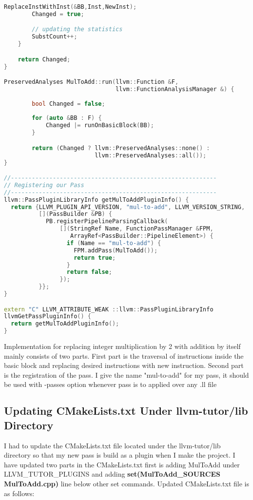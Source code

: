 \documentclass[16pt]{article}
\begin{document}
\begin{lstlisting}[caption=Implementation of MulToAdd.cpp, label=mul-to-add-implementation,
style=chstyle,language=C++]
        ReplaceInstWithInst(&BB,Inst,NewInst);
        Changed = true;

        // updating the statistics 
        SubstCount++;
    }

    return Changed;
}

PreservedAnalyses MulToAdd::run(llvm::Function &F,
                                llvm::FunctionAnalysisManager &) {
        
        bool Changed = false;
        
        for (auto &BB : F) {
            Changed |= runOnBasicBlock(BB);
        }

        return (Changed ? llvm::PreservedAnalyses::none() : 
                          llvm::PreservedAnalyses::all());                        
}

//-----------------------------------------------------------
// Registering our Pass
//-----------------------------------------------------------
llvm::PassPluginLibraryInfo getMulToAddPluginInfo() {
  return {LLVM_PLUGIN_API_VERSION, "mul-to-add", LLVM_VERSION_STRING,
          [](PassBuilder &PB) {
            PB.registerPipelineParsingCallback(
                [](StringRef Name, FunctionPassManager &FPM,
                   ArrayRef<PassBuilder::PipelineElement>) {
                  if (Name == "mul-to-add") {
                    FPM.addPass(MulToAdd());
                    return true;
                  }
                  return false;
                });
          }};
}

extern "C" LLVM_ATTRIBUTE_WEAK ::llvm::PassPluginLibraryInfo
llvmGetPassPluginInfo() {
  return getMulToAddPluginInfo();
}
\end{lstlisting}

Implementation for replacing integer multiplication by 2 with addition by itself mainly consists of two parts. First part is the traversal of instructions inside the basic block and replacing desired instructions with new instruction. Second part is the registration of the pass. I give the name "mul-to-add" for my pass, it should be used with -passes option whenever pass is to applied over any .ll file 

\subsection{Updating CMakeLists.txt Under llvm-tutor/lib Directory}
I had to update the CMakeLists.txt file located under the llvm-tutor/lib directory so that my new pass is build as a plugin when I make the project. I have updated two parts in the CMakeLists.txt first is adding MulToAdd under LLVM\_TUTOR\_PLUGINS and adding \textbf{set(MulToAdd\_SOURCES MulToAdd.cpp)} line below other set commands. Updated CMakeLists.txt file is as follows: 
\end{document}
